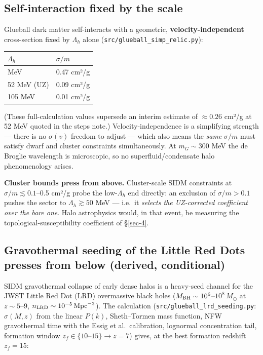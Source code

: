 \documentclass[preprint,12pt]{elsarticle}
\begin{document}
\subsection{Self-interaction fixed by the scale}\label{sec-6-1}

Glueball dark matter self-interacts with a geometric,
\textbf{velocity-independent} cross-section fixed by \(\Lambda_h\) alone
(\texttt{src/\allowbreak glueball\_\allowbreak simp\_\allowbreak relic.\allowbreak py}):

\begin{longtable}[]{@{}ll@{}}
\toprule\noalign{}
\(\Lambda_h\) & \(\sigma/m\) \\
\midrule\noalign{}
\endhead
\bottomrule\noalign{}
\endlastfoot
30 MeV & 0.47 cm²/g \\
52 MeV (UZ) & 0.09 cm²/g \\
105 MeV & 0.01 cm²/g \\
\end{longtable}

(These full-calculation values supersede an interim estimate of
\(\approx 0.26\) cm²/g at 52 MeV quoted in the steps note.)
Velocity-independence is a simplifying strength --- there is no
\(\sigma(v)\) freedom to adjust --- which also means the \emph{same}
\(\sigma/m\) must satisfy dwarf and cluster constraints simultaneously.
At \(m_G \sim 300\) MeV the de Broglie wavelength is microscopic, so no
superfluid/condensate halo phenomenology arises.

\textbf{Cluster bounds press from above.} Cluster-scale SIDM constraints
at \(\sigma/m \lesssim 0.1\)--0.5 cm²/g
\citep{Randall:2008ppe, Kaplinghat:2015aga, Tulin:2017ara} probe the
low-\(\Lambda_h\) end directly: an exclusion of \(\sigma/m > 0.1\)
pushes the sector to \(\Lambda_h \gtrsim 50\) MeV --- i.e.~it
\emph{selects the UZ-corrected coefficient over the bare one}. Halo
astrophysics would, in that event, be measuring the
topological-susceptibility coefficient of §\ref{sec-4}.

\subsection{Gravothermal seeding of the Little Red Dots presses from
below (derived, conditional)}\label{sec-6-2}

SIDM gravothermal collapse of early dense halos is a heavy-seed channel
for the JWST Little Red Dot (LRD) overmassive black holes
(\(M_{\rm BH} \sim 10^6\)--\(10^8\,M_\odot\) at \(z \sim 5\)--9,
\(n_{\rm LRD} \sim 10^{-5}\,{\rm Mpc}^{-3}\)). The calculation
(\texttt{src/\allowbreak glueball\_\allowbreak lrd\_\allowbreak seeding.\allowbreak py}: \(\sigma(M,z)\) from the linear
\(P(k)\), Sheth--Tormen mass function, NFW gravothermal time with the
Essig et al.~calibration, lognormal concentration tail, formation window
\(z_f \in \{10\text{–}15\} \to z = 7\)) gives, at the best formation
redshift \(z_f = 15\):
\end{document}
